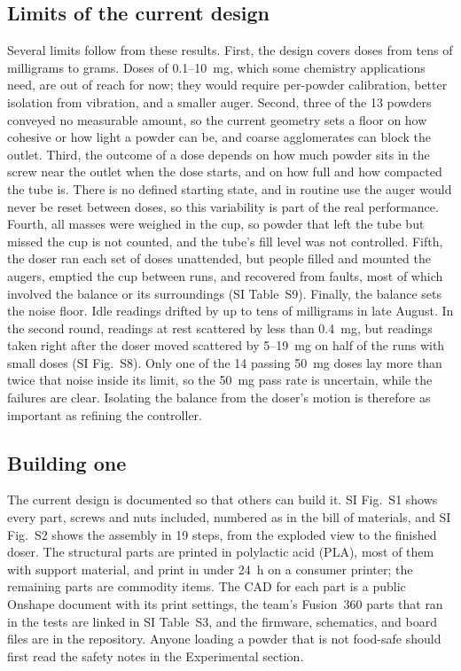 \documentclass[twoside,twocolumn,9pt]{article}
\begin{document}
\subsection{Limits of the current design}
\label{sec:limits}

Several limits follow from these results. First, the design covers doses from tens of milligrams to grams. Doses of 0.1--10~mg, which some chemistry applications need, are out of reach for now; they would require per-powder calibration, better isolation from vibration, and a smaller auger. Second, three of the 13 powders conveyed no measurable amount, so the current geometry sets a floor on how cohesive or how light a powder can be, and coarse agglomerates can block the outlet. Third, the outcome of a dose depends on how much powder sits in the screw near the outlet when the dose starts, and on how full and how compacted the tube is. There is no defined starting state, and in routine use the auger would never be reset between doses, so this variability is part of the real performance. Fourth, all masses were weighed in the cup, so powder that left the tube but missed the cup is not counted, and the tube's fill level was not controlled. Fifth, the doser ran each set of doses unattended, but people filled and mounted the augers, emptied the cup between runs, and recovered from faults, most of which involved the balance or its surroundings (SI Table~S9). Finally, the balance sets the noise floor. Idle readings drifted by up to tens of milligrams in late August. In the second round, readings at rest scattered by less than 0.4~mg, but readings taken right after the doser moved scattered by 5--19~mg on half of the runs with small doses (SI Fig.~S8). Only one of the 14 passing 50~mg doses lay more than twice that noise inside its limit, so the 50~mg pass rate is uncertain, while the failures are clear. Isolating the balance from the doser's motion is therefore as important as refining the controller.

\subsection{Building one}
\label{sec:build}

The current design is documented so that others can build it. SI Fig.~S1 shows every part, screws and nuts included, numbered as in the bill of materials, and SI Fig.~S2 shows the assembly in 19 steps, from the exploded view to the finished doser. The structural parts are printed in polylactic acid (PLA), most of them with support material, and print in under 24~h on a consumer printer; the remaining parts are commodity items. The CAD for each part is a public Onshape document with its print settings, the team's Fusion~360 parts that ran in the tests are linked in SI Table~S3, and the firmware, schematics, and board files are in the repository. Anyone loading a powder that is not food-safe should first read the safety notes in the Experimental section.
\end{document}

